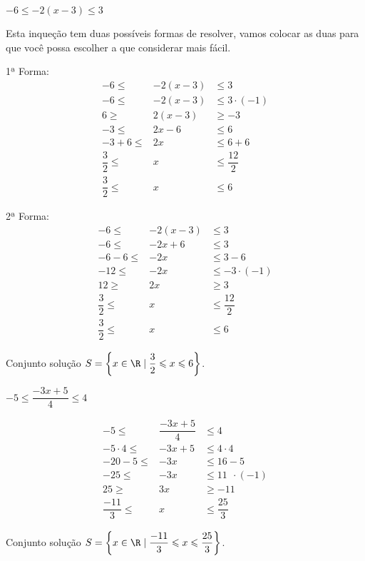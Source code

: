 \begin{exem}
$-6 \leqslant -2(x-3) \leqslant 3$

Esta inqueção tem duas possíveis formas de resolver, vamos colocar as duas para que você possa escolher a que considerar mais fácil.

1ª Forma:
 \begin{eqnarray*}
   -6 \leqslant & -2(x-3) & \leqslant 3 \\
   -6 \leqslant & -2(x-3) & \leqslant 3 \cdot (-1)\\
   6 \geqslant & 2(x-3) & \geqslant -3 \\
   -3 \leqslant & 2x - 6 & \leqslant 6 \\
   -3+6 \leqslant & 2x & \leqslant 6+6 \\
   \dfrac{3}{2} \leqslant & x & \leqslant \dfrac{12}{2} \\
   \dfrac{3}{2} \leqslant & x & \leqslant 6
 \end{eqnarray*}
 
   
2ª Forma:
 \begin{eqnarray*}
    -6 \leqslant & -2(x-3) & \leqslant 3 \\
   -6 \leqslant & -2x + 6 & \leqslant 3 \\
   -6-6 \leqslant & -2x & \leqslant 3-6  \\
   -12 \leqslant & -2x & \leqslant -3 \cdot (-1) \\
   12 \geqslant & 2x & \geqslant 3 \\
   \dfrac{3}{2} \leqslant & x & \leqslant \dfrac{12}{2} \\
   \dfrac{3}{2} \leqslant & x & \leqslant 6
 \end{eqnarray*}
      
  Conjunto solução $S= \left\{x \in \R \mid \dfrac{3}{2} \leqslant x \leqslant 6 \right\}$.

\end{exem} 

\begin{exem}
$-5 \leqslant \dfrac{-3x + 5}{4} \leqslant 4$
  
  \begin{eqnarray*}
  -5 \leqslant & \dfrac{-3x + 5}{4} & \leqslant  4 \\
   -5 \cdot 4  \leqslant & -3x + 5 & \leqslant 4 \cdot 4 \\
   -20 - 5  \leqslant & -3x & \leqslant 16 - 5 \\
   -25  \leqslant & -3x & \leqslant 11  \ \ \cdot(-1) \\
   25  \geqslant & 3x & \geqslant -11 \\
   \dfrac{-11}{3}  \leqslant & x & \leqslant \dfrac{25}{3}
 \end{eqnarray*}
 
      
  Conjunto solução $S= \left\{x \in \R \mid \dfrac{-11}{3} \leqslant x \leqslant \dfrac{25}{3} \right\}$.
\end{exem}
 
